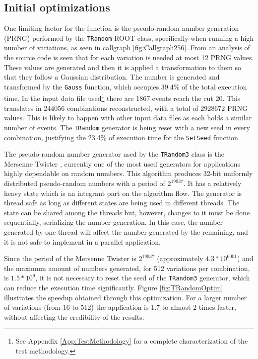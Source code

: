 \subsection{Initial optimizations}
\label{InitialOptimizations}

One limiting factor for the \ttDilepKinFit function is the pseudo-random number generation (PRNG) performed by the \texttt{TRandom} ROOT class, specifically when running a high number of variations, as seen in callgraph \ref{fig:Callgraph256}. From an analysis of the source code is seen that for each variation is needed at most 12 PRNG values. These values are generated and then it is applied a transformation to them so that they follow a Gaussian distribution. The number is generated and transformed by the \texttt{Gauss} function, which occupies 39.4\% of the total execution time. In the input data file used\footnote{See Appendix \ref{App:TestMethodology} for a complete characterization of the test methodology.} there are 1867 events reach the cut 20. This translates in 244056 combinations reconstructed, with a total of 2928672 PRNG values. This is likely to happen with other input data files as each holds a similar number of events. The \texttt{TRandom} generator is being reset with a new seed in every combination, justifying the 23.4\% of execution time for the \texttt{SetSeed} function.

The pseudo-random number generator used by the \texttt{TRandom3} class is the Mersenne Twister \cite{MersenneTwister}, currently one of the most used generators for applications highly dependable on random numbers. This algorithm produces 32-bit uniformly distributed pseudo-random numbers with a period of $2^{19937}$. It has a relatively heavy state which is an integrant part on the algorithm flow. The generator is thread safe as long as different states are being used in different threads. The state can be shared among the threads but, however, changes to it must be done sequentially, serializing the number generation. In this case, the number generated by one thread will affect the number generated by the remaining, and it is not safe to implement in a parallel application.

Since the period of the Mersenne Twister is $2^{19937}$ (approximately $4.3 * 10^{6001}$) and the maximum amount of numbers generated, for 512 variations per combination, is $1.5 * 10^{9}$, it is not necessary to reset the seed of the \texttt{TRandom3} generator, which can reduce the \ttDilepKinFit execution time significantly. Figure \ref{fig:TRandomOptim} illustrates the speedup obtained through this optimization. For a larger number of variations (from 16 to 512) the application is 1.7 to almost 2 times faster, without affecting the credibility of the results.

